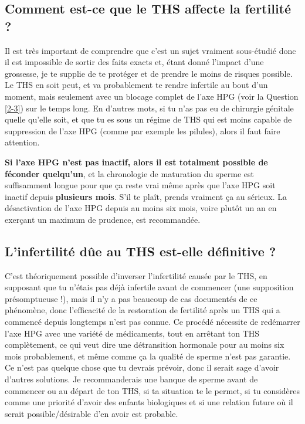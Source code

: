 \documentclass{article}
\begin{document}
\subsection{Comment est-ce que le THS affecte la fertilité ?}\label{11-42}

Il est très important de comprendre que c'est un sujet vraiment sous-étudié donc il est impossible de sortir des faits exacts et, étant donné l'impact d'une grossesse, je te supplie de te protéger et de prendre le moins de risques possible. Le THS en soit peut, et va probablement te rendre infertile au bout d'un moment, mais seulement avec un blocage complet de l'axe HPG (voir la Question \ref{2-3}) sur le temps long. En d'autres mots, si tu n'as pas eu de chirurgie génitale quelle qu'elle soit, et que tu es sous un régime de THS qui est moins capable de suppression de l'axe HPG (comme par exemple les pilules), alors il faut faire attention.

\textbf{Si l'axe HPG n'est pas inactif, alors il est totalment possible de féconder quelqu'un}, et la chronologie de maturation du sperme est suffisamment longue pour que ça reste vrai même après que l'axe HPG soit inactif depuis \textbf{plusieurs mois}. S'il te plaît, prends vraiment ça au sérieux. La désactivation de l'axe HPG depuis au moins six mois, voire plutôt un an en exerçant un maximum de prudence, est recommandée. 

\subsection{L'infertilité dûe au THS est-elle définitive ?}\label{11-43}

C'est théoriquement possible d'inverser l'infertilité causée par le THS, en supposant que tu n'étais pas déjà infertile avant de commencer (une supposition présomptueuse !), mais il n'y a pas beaucoup de cas documentés de ce phénomène, donc l'efficacité de la restoration de fertilité après un THS qui a commencé depuis longtemps n'est pas connue. Ce procédé nécessite de redémarrer l'axe HPG avec une variété de médicaments, tout en arrêtant ton THS complètement, ce qui veut dire une détransition hormonale pour au moins six mois probablement, et même comme ça la qualité de sperme n'est pas garantie. Ce n'est pas quelque chose que tu devrais prévoir, donc il serait sage d'avoir d'autres solutions. Je recommanderais une banque de sperme avant de commencer ou au départ de ton THS, si ta situation te le permet, si tu considères comme une priorité d'avoir des enfants biologiques et si une relation future où il serait possible/désirable d'en avoir est probable.  
\end{document}
